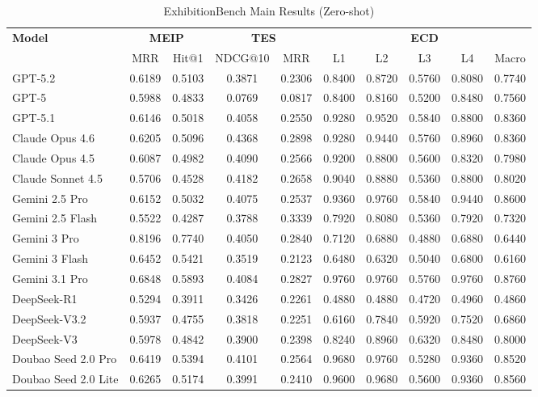 \begin{table}[ht]
\centering
\caption{ExhibitionBench Main Results (Zero-shot)}
\label{tab:main-results-shot0}
\begin{tabular}{l|cc|cc|ccccc}
\toprule
\textbf{Model} & \multicolumn{2}{c|}{\textbf{MEIP}} & \multicolumn{2}{c|}{\textbf{TES}} & \multicolumn{5}{c}{\textbf{ECD}} \\
 & MRR & Hit@1 & NDCG@10 & MRR & L1 & L2 & L3 & L4 & Macro \\
\midrule
GPT-5.2 & 0.6189 & 0.5103 & 0.3871 & 0.2306 & 0.8400 & 0.8720 & 0.5760 & 0.8080 & 0.7740 \\
GPT-5 & 0.5988 & 0.4833 & 0.0769 & 0.0817 & 0.8400 & 0.8160 & 0.5200 & 0.8480 & 0.7560 \\
GPT-5.1 & 0.6146 & 0.5018 & 0.4058 & 0.2550 & 0.9280 & 0.9520 & 0.5840 & 0.8800 & 0.8360 \\
Claude Opus 4.6 & 0.6205 & 0.5096 & 0.4368 & 0.2898 & 0.9280 & 0.9440 & 0.5760 & 0.8960 & 0.8360 \\
Claude Opus 4.5 & 0.6087 & 0.4982 & 0.4090 & 0.2566 & 0.9200 & 0.8800 & 0.5600 & 0.8320 & 0.7980 \\
Claude Sonnet 4.5 & 0.5706 & 0.4528 & 0.4182 & 0.2658 & 0.9040 & 0.8880 & 0.5360 & 0.8800 & 0.8020 \\
Gemini 2.5 Pro & 0.6152 & 0.5032 & 0.4075 & 0.2537 & 0.9360 & 0.9760 & 0.5840 & 0.9440 & 0.8600 \\
Gemini 2.5 Flash & 0.5522 & 0.4287 & 0.3788 & 0.3339 & 0.7920 & 0.8080 & 0.5360 & 0.7920 & 0.7320 \\
Gemini 3 Pro & 0.8196 & 0.7740 & 0.4050 & 0.2840 & 0.7120 & 0.6880 & 0.4880 & 0.6880 & 0.6440 \\
Gemini 3 Flash & 0.6452 & 0.5421 & 0.3519 & 0.2123 & 0.6480 & 0.6320 & 0.5040 & 0.6800 & 0.6160 \\
Gemini 3.1 Pro & 0.6848 & 0.5893 & 0.4084 & 0.2827 & 0.9760 & 0.9760 & 0.5760 & 0.9760 & 0.8760 \\
DeepSeek-R1 & 0.5294 & 0.3911 & 0.3426 & 0.2261 & 0.4880 & 0.4880 & 0.4720 & 0.4960 & 0.4860 \\
DeepSeek-V3.2 & 0.5937 & 0.4755 & 0.3818 & 0.2251 & 0.6160 & 0.7840 & 0.5920 & 0.7520 & 0.6860 \\
DeepSeek-V3 & 0.5978 & 0.4842 & 0.3900 & 0.2398 & 0.8240 & 0.8960 & 0.6320 & 0.8480 & 0.8000 \\
Doubao Seed 2.0 Pro & 0.6419 & 0.5394 & 0.4101 & 0.2564 & 0.9680 & 0.9760 & 0.5280 & 0.9360 & 0.8520 \\
Doubao Seed 2.0 Lite & 0.6265 & 0.5174 & 0.3991 & 0.2410 & 0.9600 & 0.9680 & 0.5600 & 0.9360 & 0.8560 \\

\end{tabular}
\end{table}
